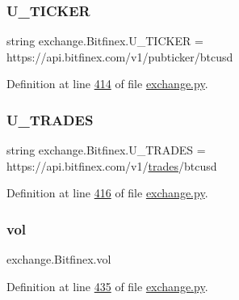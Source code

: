 \subsubsection{\texorpdfstring{U\+\_\+\+T\+I\+C\+K\+ER}{U\_TICKER}}
{\footnotesize\ttfamily string exchange.\+Bitfinex.\+U\+\_\+\+T\+I\+C\+K\+ER = \textquotesingle{}https\+://api.\+bitfinex.\+com/v1/pubticker/btcusd\textquotesingle{}\hspace{0.3cm}{\ttfamily [static]}}



Definition at line \hyperlink{exchange_8py_source_l00414}{414} of file \hyperlink{exchange_8py_source}{exchange.\+py}.

\mbox{\label{classexchange_1_1_bitfinex_a0c5420b5b95248ee7b57bf694b21f3b5}} 
\subsubsection{\texorpdfstring{U\+\_\+\+T\+R\+A\+D\+ES}{U\_TRADES}}
{\footnotesize\ttfamily string exchange.\+Bitfinex.\+U\+\_\+\+T\+R\+A\+D\+ES = \textquotesingle{}https\+://api.\+bitfinex.\+com/v1/\hyperlink{classexchange_1_1_exchange_a30e87a377320ce05bd956fb014683641}{trades}/btcusd\textquotesingle{}\hspace{0.3cm}{\ttfamily [static]}}



Definition at line \hyperlink{exchange_8py_source_l00416}{416} of file \hyperlink{exchange_8py_source}{exchange.\+py}.

\mbox{\label{classexchange_1_1_bitfinex_a278da3a9eab93e256041c988f9bbd54c}} 
\subsubsection{\texorpdfstring{vol}{vol}}
{\footnotesize\ttfamily exchange.\+Bitfinex.\+vol}



Definition at line \hyperlink{exchange_8py_source_l00435}{435} of file \hyperlink{exchange_8py_source}{exchange.\+py}.



